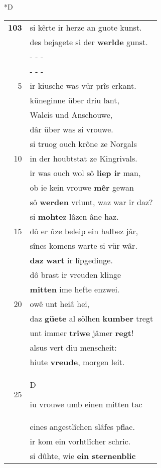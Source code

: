 \documentclass[8pt,a4paper,notitlepage]{article}
\begin{document}
\begin{table}[ht]
\begin{minipage}[t]{0.5\linewidth}
\small
\begin{center}*D
\end{center}
\begin{tabular}{rl}
\textbf{103} & si kêrte ir herze an guote kunst.\\ 
 & des bejagete si der \textbf{werlde} gunst.\\ 
 & \multicolumn{1}{l}{ - - - }\\ 
 & \multicolumn{1}{l}{ - - - }\\ 
5 & ir kiusche was vür prîs erkant.\\ 
 & küneginne über driu lant,\\ 
 & Waleis und Anschouwe,\\ 
 & dâr über was si vrouwe.\\ 
 & si truog ouch krône ze Norgals\\ 
10 & in der houbtstat ze Kingrivals.\\ 
 & ir was ouch wol sô \textbf{liep ir} man,\\ 
 & ob ie kein vrouwe \textbf{mêr} gewan\\ 
 & sô \textbf{werden} vriunt, waz war ir daz?\\ 
 & si \textbf{mohte}z lâzen âne haz.\\ 
15 & dô er ûze beleip ein halbez jâr,\\ 
 & sînes komens warte si vür wâr.\\ 
 & \textbf{daz} \textbf{wart} ir lîpgedinge.\\ 
 & dô brast ir vreuden klinge\\ 
 & \textbf{mitten} ime hefte enzwei.\\ 
20 & owê unt heiâ hei,\\ 
 & daz \textbf{güete} al sölhen \textbf{kumber} tregt\\ 
 & unt immer \textbf{triwe} jâmer \textbf{regt}!\\ 
 & alsus vert diu menscheit:\\ 
 & hiute \textbf{vreude}, morgen leit.\\ 
25 & \begin{large}D\end{large}iu vrouwe umb einen mitten tac\\ 
 & eines angestlîchen slâfes pflac.\\ 
 & ir kom ein vorhtlîcher schric.\\ 
 & si dûhte, wie \textbf{ein sternenblic}\\ 

\end{tabular}
\end{minipage}
\end{table}
\end{document}

